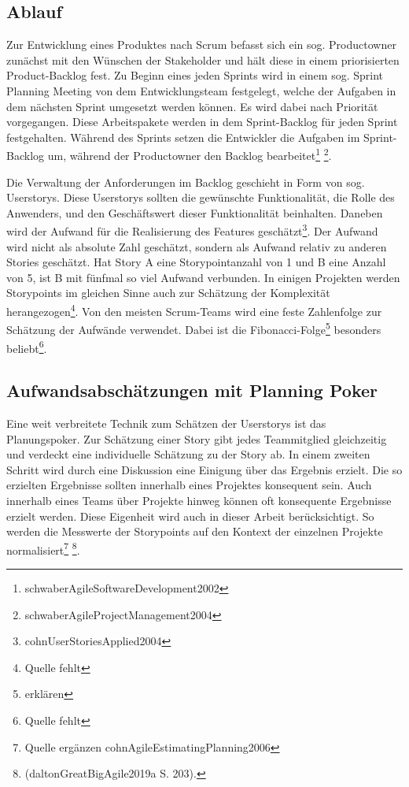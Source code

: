 \subsection{Ablauf}\label{Ablauf}

Zur Entwicklung eines Produktes nach Scrum befasst sich ein sog.
Productowner zunächst mit den Wünschen der Stakeholder und hält diese in
einem priorisierten Product-Backlog fest. Zu Beginn eines jeden Sprints
wird in einem sog. Sprint Planning Meeting von dem Entwicklungsteam
festgelegt, welche der Aufgaben in dem nächsten Sprint umgesetzt werden
können. Es wird dabei nach Priorität vorgegangen. Diese Arbeitspakete
werden in dem Sprint-Backlog für jeden Sprint festgehalten. Während des
Sprints setzen die Entwickler die Aufgaben im Sprint-Backlog um, während
der Productowner den Backlog bearbeitet\footnote{schwaberAgileSoftwareDevelopment2002}
\footnote{schwaberAgileProjectManagement2004}.

Die Verwaltung der Anforderungen im Backlog geschieht in Form von sog.
Userstorys. Diese Userstorys sollten die gewünschte Funktionalität, die
Rolle des Anwenders, und den Geschäftswert dieser Funktionalität
beinhalten. Daneben wird der Aufwand für die Realisierung des Features
geschätzt\footnote{cohnUserStoriesApplied2004}. Der Aufwand wird nicht
als absolute Zahl geschätzt, sondern als Aufwand relativ zu anderen
Stories geschätzt. Hat Story A eine Storypointanzahl von 1 und B eine
Anzahl von 5, ist B mit fünfmal so viel Aufwand verbunden. In einigen
Projekten werden Storypoints im gleichen Sinne auch zur Schätzung der
Komplexität herangezogen\footnote{Quelle fehlt}. Von den meisten
Scrum-Teams wird eine feste Zahlenfolge zur Schätzung der Aufwände
verwendet. Dabei ist die Fibonacci-Folge\footnote{erklären} besonders
beliebt\footnote{Quelle fehlt}.

\subsection{Aufwandsabschätzungen mit Planning Poker}\label{Aufwandsabschatzungen-mit-Planning-Poker}

Eine weit verbreitete Technik zum Schätzen der Userstorys ist das
Planungspoker. Zur Schätzung einer Story gibt jedes Teammitglied
gleichzeitig und verdeckt eine individuelle Schätzung zu der Story ab.
In einem zweiten Schritt wird durch eine Diskussion eine Einigung über
das Ergebnis erzielt. Die so erzielten Ergebnisse sollten innerhalb
eines Projektes konsequent sein. Auch innerhalb eines Teams über
Projekte hinweg können oft konsequente Ergebnisse erzielt werden. Diese
Eigenheit wird auch in dieser Arbeit berücksichtigt. So werden die
Messwerte der Storypoints auf den Kontext der einzelnen Projekte
normalisiert\footnote{Quelle ergänzen cohnAgileEstimatingPlanning2006}
\footnote{(daltonGreatBigAgile2019a S. 203).}.

